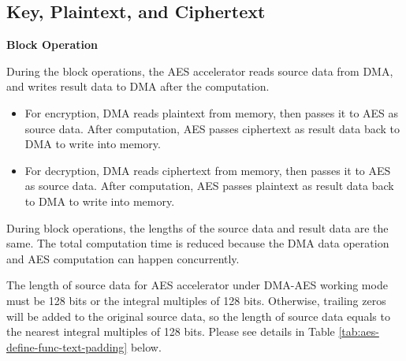 \documentclass[main\_\_EN.tex]{subfiles}
\begin{document}

\subsection{Key, Plaintext, and Ciphertext}

\textbf{Block Operation}

During the block operations, the AES accelerator reads source data from DMA, and writes result data to DMA after the computation.

\begin{itemize}
    \item For encryption, DMA reads plaintext from memory, then passes it to AES as source data. After computation, AES passes ciphertext as result data  back to DMA to write into memory.
    \item For decryption, DMA reads ciphertext from memory, then passes it to AES as source data. After computation, AES passes plaintext as result data back to DMA to write into memory.
\end{itemize}

During block operations, the lengths of the source data and result data are the same. The total computation time is reduced because the DMA data operation and AES computation can happen concurrently.

\label{api:textpadding}The length of source data for AES accelerator under DMA-AES working mode must be 128 bits or the integral multiples of 128 bits. Otherwise, trailing zeros will be added to the original source data, so the length of source data equals to the nearest integral multiples of 128 bits. Please see details in Table \ref{tab:aes-define-func-text-padding} below.

\end{document}
